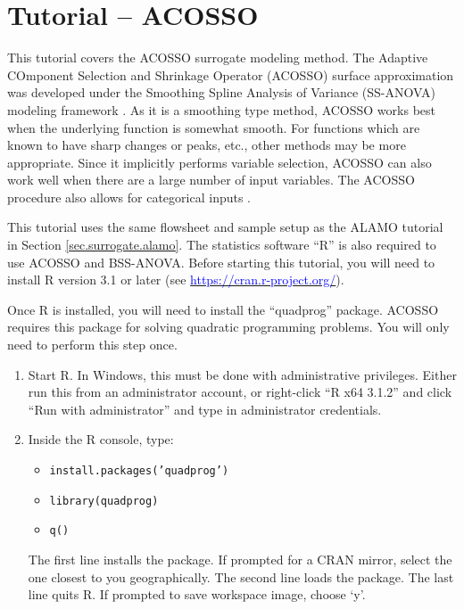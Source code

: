 \section{Tutorial -- ACOSSO}
\label{(sec.surrogate.acosso)}

This tutorial covers the ACOSSO surrogate modeling method. The Adaptive
COmponent Selection and Shrinkage Operator (ACOSSO) surface approximation
was developed under the Smoothing Spline Analysis of Variance (SS-ANOVA)
modeling framework \citep{Storlie_2011}. As it is a smoothing type method,
ACOSSO works best when the underlying function is somewhat smooth. For
functions which are known to have sharp changes or peaks, etc., other
methods may be more appropriate. Since it implicitly performs variable
selection, ACOSSO can also work well when there are a large number of input
variables. 
The ACOSSO procedure also allows for
categorical inputs \citep{Storlie_2013}.
 
This tutorial uses the same flowsheet and sample setup as the ALAMO
tutorial in Section \ref{sec.surrogate.alamo}. The statistics software
``R'' is also required to use ACOSSO and BSS-ANOVA. Before starting this
tutorial, you will need to install R version 3.1 or later (see \href{http://cran.r-project.org/}{\textcolor{blue}{https://cran.r-project.org/}}). 

Once R is installed, you will need to install the ``quadprog''
package. ACOSSO requires this package for solving quadratic
programming problems. You will only need to perform this step once. 

\begin{enumerate}
\item{Start R. In Windows, this must be done with administrative
  privileges.  Either run this from an administrator account, or
  right-click ``R x64 3.1.2'' and click ``Run with administrator'' and type
  in administrator credentials.}
\item{Inside the R console, type:
   \begin{itemize} 
   \item \tt install.packages('quadprog')
   \item \tt library(quadprog)
   \item \tt q()
  \end{itemize}
The first line installs the package. If prompted for a CRAN mirror, select
the one closest to you geographically. The second line loads the
package. The last line quits R. If prompted to save workspace image, choose
`y'.}
\end{enumerate}

